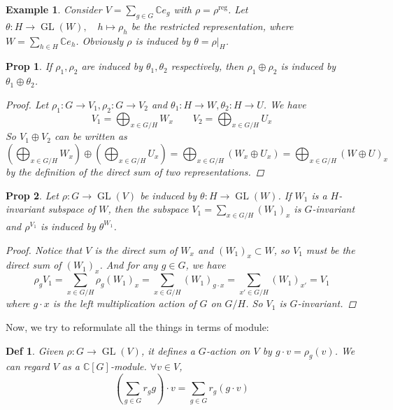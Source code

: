 \documentclass[a4paper]{article}
\newcommand*{\Cb}{\mathbb{C}}
\newcommand*\GL[1]{\operatorname{GL}\mathopen{}\left({#1}\right)\mathclose{}}
\theoremstyle{mystyle}
\newtheorem{definition}{Def}
\newtheorem{example}{Example}
\newtheorem{prop}{Prop}
\begin{document}
\begin{example}
  Consider $\displaystyle V = \sum_{g\in G} \Cb e_g$ with
  $\rho = \rho^\text{reg}$. Let $\theta: H\to \GL{W}, \quad h \mapsto \rho_h$
  be the restricted representation, where
  $\displaystyle W = \sum_{h\in H} \Cb e_h$. Obviously $\rho$ is
  induced by $\theta = \rho|_H$.
\end{example}

\begin{prop}
  If $\rho_1, \rho_2$ are induced by $\theta_1, \theta_2$ respectively, then
  $\rho_1 \oplus \rho_2$ is induced by $\theta_1 \oplus \theta_2$.

  \begin{proof}
    Let $\rho_1: G\to V_1, \rho_2: G\to V_2$ and
    $\theta_1: H\to W, \theta_2: H\to U$. We have
    \[
      V_1 = \bigoplus_{x\in G/H} W_x \qquad V_2 = \bigoplus_{x\in G/H} U_x
    \]
    So $V_1 \oplus V_2$ can be written as
    \[
      \left(\bigoplus_{x\in G/H} W_x\right) \oplus
      \left(\bigoplus_{x\in G/H} U_x\right)
      = \bigoplus_{x\in G/H} (W_x \oplus U_x)
      = \bigoplus_{x\in G/H} (W \oplus U)_x
    \]
    by the definition of the direct sum of two representations.
  \end{proof}
\end{prop}

\begin{prop}
  Let $\rho: G\to \GL{V}$ be induced by $\theta: H\to \GL{W}$. If $W_1$ is
  a $H$-invariant subspace of $W$, then the subspace
  $\displaystyle V_1 = \sum_{x \in G/H} (W_1)_x$ is $G$-invariant and
  $\rho^{V_1}$ is induced by $\theta^{W_1}$.
  \begin{proof}
    Notice that $V$ is the direct sum of $W_x$ and $(W_1)_x \subset W$, so
    $V_1$ must be the direct sum of $(W_1)_x$. And for any $g\in G$, we have
    \[
      \rho_g V_1 = \sum_{x\in G/H} \rho_g (W_1)_x
      = \sum_{x\in G/H} (W_1)_{g\cdot x}
      = \sum_{x'\in G/H} (W_1)_{x'} = V_1
    \]
    where $g\cdot x$ is the left multiplication action of $G$ on $G/H$.
    So $V_1$ is $G$-invariant.
  \end{proof}
\end{prop}

Now, we try to reformulate all the things in terms of module:

\begin{definition}
  Given $\rho: G\to \GL{V}$, it defines a $G$-action on $V$ by
  $g\cdot v = \rho_g(v)$. We can regard $V$ as a $\Cb[G]$-module.
  $\forall v \in V$,
  \[
    \left(\sum_{g\in G} r_g g\right) \cdot v
    =\sum_{g\in G} r_g (g\cdot v)
  \]
\end{definition}
\end{document}
